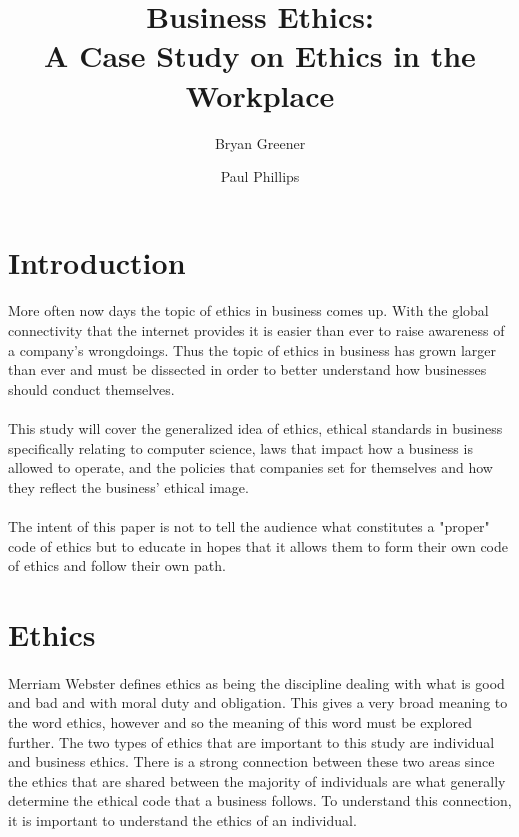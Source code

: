 \documentclass[a4paper,12pt]{article}
\author{Bryan Greener \and Paul Phillips}
\title{Business Ethics:\\A Case Study on Ethics in the Workplace}
\newcommand{\mychapter}[2]{
	\setcounter{chapter}{#1}
	\setcounter{section}{0}
	\chapter*{#2}
	\addcontentsline{toc}{chapter}{#2}
}
\begin{document}
\maketitle

\pagebreak
\section*{Introduction}
\paragraph{}More often now days the topic of ethics in business comes up. With the global connectivity that the internet provides it is easier than ever to raise awareness of a company's wrongdoings. Thus the topic of ethics in business has grown larger than ever and must be dissected in order to better understand how businesses should conduct themselves.

\paragraph{}This study will cover the generalized idea of ethics, ethical standards in business specifically relating to computer science, laws that impact how a business is allowed to operate, and the policies that companies set for themselves and how they reflect the business' ethical image.

\paragraph{}The intent of this paper is not to tell the audience what constitutes a "proper" code of ethics but to educate in hopes that it allows them to form their own code of ethics and follow their own path.

\section*{Ethics}
\paragraph{}Merriam Webster defines ethics as being the discipline dealing with what is good and bad and with moral duty and obligation. This gives a very broad meaning to the word ethics, however and so the meaning of this word must be explored further. The two types of ethics that are important to this study are individual and business ethics. There is a strong connection between these two areas since the ethics that are shared between the majority of individuals are what generally determine the ethical code that a business follows. To understand this connection, it is important to understand the ethics of an individual.
\end{document}
